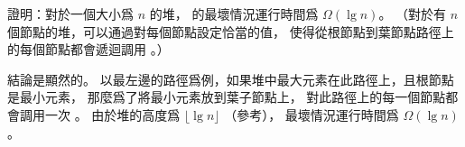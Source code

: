 \startEXERCISE
證明：對於一個大小爲 $n$ 的堆，  的最壞情況運行時間爲 $\Omega(\lg{n})$。
（\hint 對於有 $n$ 個節點的堆，可以通過對每個節點設定恰當的值，
使得從根節點到葉節點路徑上的每個節點都會遞迴調用 。）
\stopEXERCISE

\startANSWER
結論是顯然的。
以最左邊的路徑爲例，如果堆中最大元素在此路徑上，且根節點是最小元素，
那麼爲了將最小元素放到葉子節點上，
對此路徑上的每一個節點都會調用一次 。
由於堆的高度爲 $\lfloor \lg{n} \rfloor$ （參考），
最壞情況運行時間爲 $\Omega(\lg{n})$。
\stopANSWER
